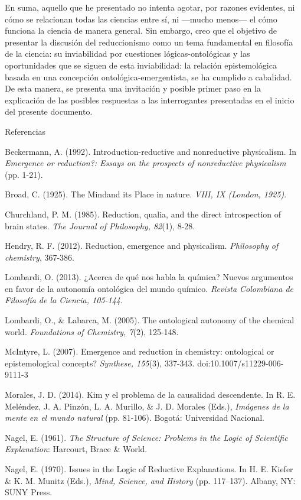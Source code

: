 \documentclass[]{book}
\begin{document}
En suma, aquello que he presentado no intenta agotar, por razones
evidentes, ni cómo se relacionan todas las ciencias entre sí, ni
---mucho menos--- el cómo funciona la ciencia de manera general. Sin
embargo, creo que el objetivo de presentar la discusión del
reduccionismo como un tema fundamental en filosofía de la ciencia: su
inviabilidad por cuestiones lógicas-ontológicas y las oportunidades que
se siguen de esta inviabilidad: la relación epistemológica basada en una
concepción ontológica-emergentista, se ha cumplido a cabalidad. De esta
manera, se presenta una invitación y posible primer paso en la
explicación de las posibles respuestas a las interrogantes presentadas
en el inicio del presente documento.

Referencias

Beckermann, A. (1992). Introduction-reductive and nonreductive
physicalism. In \emph{Emergence or reduction?: Essays on the prospects
of nonreductive physicalism} (pp. 1-21).

Broad, C. (1925). The Mindand its Place in nature. \emph{VIII, IX
(London, 1925)}.

Churchland, P. M. (1985). Reduction, qualia, and the direct
introspection of brain states. \emph{The Journal of Philosophy, 82}(1),
8-28.

Hendry, R. F. (2012). Reduction, emergence and physicalism.
\emph{Philosophy of chemistry}, 367-386.

Lombardi, O. (2013). ¿Acerca de qué nos habla la química? Nuevos
argumentos en favor de la autonomía ontológica del mundo químico.
\emph{Revista Colombiana de Filosofía de la Ciencia, 105-144}.

Lombardi, O., \& Labarca, M. (2005). The ontological autonomy of the
chemical world. \emph{Foundations of Chemistry, 7}(2), 125-148.

McIntyre, L. (2007). Emergence and reduction in chemistry: ontological
or epistemological concepts? \emph{Synthese, 155}(3), 337-343.
doi:10.1007/s11229-006-9111-3

Morales, J. D. (2014). Kim y el problema de la causalidad descendente.
In R. E. Meléndez, J. A. Pinzón, L. A. Murillo, \& J. D. Morales (Eds.),
\emph{Imágenes de la mente en el mundo natural} (pp. 81-106). Bogotá:
Universidad Nacional.

Nagel, E. (1961). \emph{The Structure of Science: Problems in the Logic
of Scientific Explanation}: Harcourt, Brace \& World.

Nagel, E. (1970). Issues in the Logic of Reductive Explanations. In H.
E. Kiefer \& K. M. Munitz (Eds.), \emph{Mind, Science, and History} (pp.
117--137). Albany, NY: SUNY Press.
\end{document}
